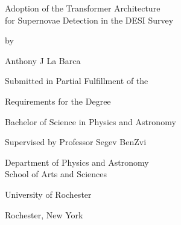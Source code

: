 \begin{titlepage}
  \vspace*{\fill}

  \begin{center}
    {\Huge Adoption of the Transformer Architecture \\for Supernovae Detection in the DESI Survey\par
    }

    \bigskip%
    by

    \bigskip%
    Anthony J La Barca


    \bigskip\bigskip\bigskip\bigskip%
    Submitted in Partial Fulfillment of the

    \bigskip%
    Requirements for the Degree

    \bigskip%
    Bachelor of Science in Physics and Astronomy


    \bigskip\bigskip\bigskip\bigskip%
    Supervised by Professor Segev BenZvi

    \bigskip\bigskip%
    Department of Physics and Astronomy\\
    School of Arts and Sciences


    \bigskip\bigskip\bigskip\bigskip%
    University of Rochester

    \bigskip%
    Rochester, New York


    \bigskip\bigskip\bigskip{}
  \end{center}

  \vspace*{\fill}
\end{titlepage}

